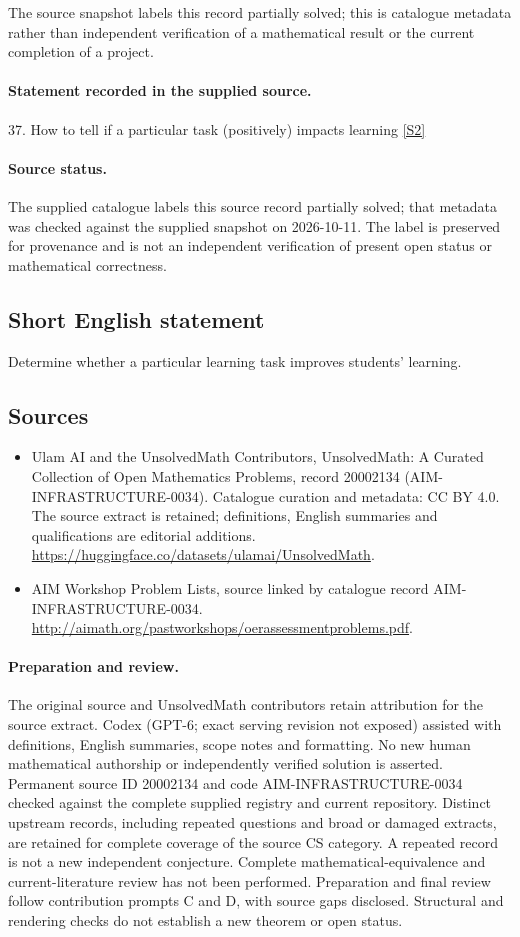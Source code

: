 \documentclass[11pt]{article}
\begin{document}
The source snapshot labels this record partially solved; this is catalogue metadata rather than independent verification of a mathematical result or the current completion of a project.
\paragraph{Statement recorded in the supplied source.}
37. How to tell if a particular task (positively) impacts learning \href{http://aimath.org/pastworkshops/oerassessmentproblems.pdf}{[S2]}
\paragraph{Source status.}
The supplied catalogue labels this source record partially solved; that metadata was checked against the supplied snapshot on 2026-10-11. The label is preserved for provenance and is not an independent verification of present open status or mathematical correctness.
\subsection{Short English statement}
Determine whether a particular learning task improves students' learning.
\subsection{Sources}
\begin{itemize}
\item[S1] Ulam AI and the UnsolvedMath Contributors, UnsolvedMath: A Curated Collection of Open Mathematics Problems, record 20002134 (AIM-INFRASTRUCTURE-0034). Catalogue curation and metadata: CC BY 4.0. The source extract is retained; definitions, English summaries and qualifications are editorial additions.
\url{https://huggingface.co/datasets/ulamai/UnsolvedMath}.
\item[S2] AIM Workshop Problem Lists, source linked by catalogue record AIM-INFRASTRUCTURE-0034.
\url{http://aimath.org/pastworkshops/oerassessmentproblems.pdf}.
\end{itemize}
\paragraph{Preparation and review.}
The original source and UnsolvedMath contributors retain attribution for the source extract. Codex (GPT-6; exact serving revision not exposed) assisted with definitions, English summaries, scope notes and formatting. No new human mathematical authorship or independently verified solution is asserted. Permanent source ID 20002134 and code AIM-INFRASTRUCTURE-0034 checked against the complete supplied registry and current repository. Distinct upstream records, including repeated questions and broad or damaged extracts, are retained for complete coverage of the source CS category. A repeated record is not a new independent conjecture. Complete mathematical-equivalence and current-literature review has not been performed. Preparation and final review follow contribution prompts C and D, with source gaps disclosed. Structural and rendering checks do not establish a new theorem or open status.
\label{end:20002134}
\end{document}
